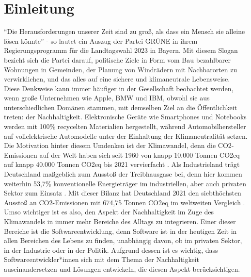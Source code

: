 \chapter{Einleitung} %
\enquote{Die Herausforderungen unserer Zeit sind zu groß, als dass ein Mensch sie alleine lösen könnte} - so lautet ein Auszug der Partei GRÜNE in ihrem Regierungsprogramm für die Landtagswahl 2023 in Bayern. Mit diesem Slogan bezieht sich die Partei darauf, politische Ziele in Form vom Bau bezahlbarer Wohnungen in Gemeinden, der Planung von Windrädern mit Nachbarorten zu verwirklichen, und das alles auf eine sichere und klimaneutrale Lebensweise. \\ Diese Denkweise kann immer häufiger in der Gesellschaft beobachtet werden, wenn große Unternehmen wie Apple, BMW und IBM, obwohl sie aus unterschiedlichen Domänen stammen, mit demselben Ziel an die Öffentlichkeit treten: der Nachhaltigkeit. Elektronische Geräte wie Smartphones und Notebooks werden mit 100\% recycelten Materialien hergestellt, während Automobilhersteller auf vollelektrische Automodelle unter der Einhaltung der Klimaneutralität setzen. Die Motivation hinter diesem Umdenken ist der Klimawandel, denn die CO2-Emissionen auf der Welt haben sich seit 1960 von knapp 10.000 Tonnen CO2eq auf knapp 40.000 Tonnen CO2eq bis 2021 vervierfacht \cite{GlobalCarbonAtlas2023}. Als Industrieland trägt Deutschland maßgeblich zum Ausstoß der Treibhausgase bei, denn hier kommen weiterhin 53,7\% konventionelle Energieträger im industriellen, aber auch privaten Sektor zum Einsatz \cite{StatistischesBundesamt2023}. Mit dieser Bilanz hat Deutschland 2021 den siebthöchsten Ausstoß an CO2-Emissionen mit 674,75 Tonnen CO2eq im weltweiten Vergleich \cite{GlobalCarbonAtlas2023}. \\
Umso wichtiger ist es also, den Aspekt der Nachhaltigkeit im Zuge des Klimawandels in immer mehr Bereiche des Alltags zu integrieren. Einer dieser Bereiche ist die Softwareentwicklung, denn Software ist in der heutigen Zeit in allen Bereichen des Lebens zu finden, unabhängig davon, ob im privaten Sektor, in der Industrie oder in der Politik. Aufgrund dessen ist es wichtig, dass Softwareentwickler*innen sich mit dem Thema der Nachhaltigkeit auseinandersetzen und Lösungen entwickeln, die diesen Aspekt berücksichtigen.

